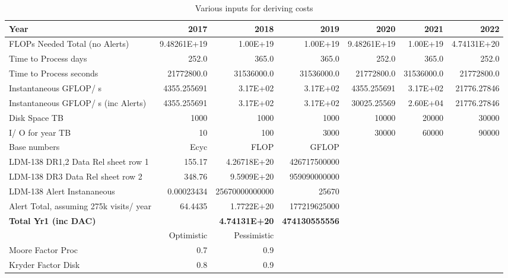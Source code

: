 \tiny \begin{longtable} { |p{}  |r  |r  |r  |r  |r  |r |} 
\caption{Various inputs for deriving costs \label{tab:Inputs}}\\ 
\hline 
\textbf{Year}&\textbf{2017}&\textbf{2018}&\textbf{2019}&\textbf{2020}&\textbf{2021}&\textbf{2022} \\ \hline
{FLOPs Needed Total (no Alerts)}&{9.48261E+19}&{1.00E+19}&{1.00E+19}&{9.48261E+19}&{1.00E+19}&{4.74131E+20} \\ \hline
{Time to Process days}&{252.0}&{365.0}&{365.0}&{252.0}&{365.0}&{252.0} \\ \hline
{Time to Process seconds}&{21772800.0}&{31536000.0}&{31536000.0}&{21772800.0}&{31536000.0}&{21772800.0} \\ \hline
{Instantaneous GFLOP/ s}&{4355.255691}&{3.17E+02}&{3.17E+02}&{4355.255691}&{3.17E+02}&{21776.27846} \\ \hline
{Instantaneous GFLOP/ s (inc Alerts)}&{4355.255691}&{3.17E+02}&{3.17E+02}&{30025.25569}&{2.60E+04}&{21776.27846} \\ \hline
{Disk Space TB}&{1000}&{1000}&{1000}&{10000}&{20000}&{30000} \\ \hline
{I/ O for year TB}&{10}&{100}&{3000}&{30000}&{60000}&{90000} \\ \hline
{Base numbers }&{Ecyc }&{FLOP}&{GFLOP}&&& \\ \hline
{LDM-138 DR1,2 Data Rel sheet row 1}&{155.17}&{4.26718E+20}&{426717500000}&&& \\ \hline
{LDM-138 DR3 Data Rel sheet row 2}&{348.76}&{9.5909E+20}&{959090000000}&&& \\ \hline
{LDM-138 Alert Instananeous}&{0.00023434}&{25670000000000}&{25670}&&& \\ \hline
{Alert Total, assuming 275k visits/ year}&{64.4435}&{1.7722E+20}&{177219625000}&&& \\ \hline
\textbf{Total Yr1 (inc DAC)}&\textbf{}&\textbf{4.74131E+20}&\textbf{474130555556}&&& \\ \hline
{}&{Optimistic}&{Pessimistic}&&&& \\ \hline
{Moore Factor Proc}&{0.7}&{0.9}&&&& \\ \hline
{Kryder Factor Disk}&{0.8}&{0.9}&&&& \\ \hline
\end{longtable} \normalsize
